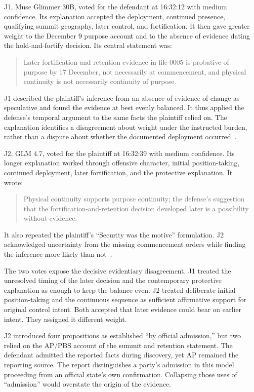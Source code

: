 J1, Muse Glimmer 30B, voted for the defendant at 16:32:12 with medium confidence.  Its explanation accepted the deployment, continued presence, qualifying summit geography, later control, and fortification.  It then gave greater weight to the December 9 purpose account and to the absence of evidence dating the hold-and-fortify decision.  Its central statement was:
\begin{quote}
Later fortification and retention evidence in file-0005 is probative of purpose by 17 December, not necessarily at commencement, and physical continuity is not necessarily continuity of purpose.
\end{quote}
J1 described the plaintiff's inference from an absence of evidence of change as speculative and found the evidence at best evenly balanced.  It thus applied the defense's temporal argument to the same facts the plaintiff relied on.  The explanation identifies a disagreement about weight under the instructed burden, rather than a dispute about whether the documented deployment occurred~\cite[event 343]{record}.

J2, GLM 4.7, voted for the plaintiff at 16:32:39 with medium confidence.  Its longer explanation worked through offensive character, initial position-taking, continued deployment, later fortification, and the protective explanation.  It wrote:
\begin{quote}
Physical continuity supports purpose continuity; the defense's suggestion that the fortification-and-retention decision developed later is a possibility without evidence.
\end{quote}
It also repeated the plaintiff's “Security was the motive” formulation.  J2 acknowledged uncertainty from the missing commencement orders while finding the inference more likely than not~\cite[event 347]{record}.

The two votes expose the decisive evidentiary disagreement.  J1 treated the unresolved timing of the later decision and the contemporary protective explanation as enough to keep the balance even.  J2 treated deliberate initial position-taking and the continuous sequence as sufficient affirmative support for original control intent.  Both accepted that later evidence could bear on earlier intent.  They assigned it different weight.

J2 introduced four propositions as established “by official admission,” but two relied on the AP/PBS account of the summit and retention statement.  The defendant admitted the reported facts during discovery, yet AP remained the reporting source.  The report distinguishes a party's admission in this model proceeding from an official state's own confirmation.  Collapsing those uses of “admission” would overstate the origin of the evidence.

